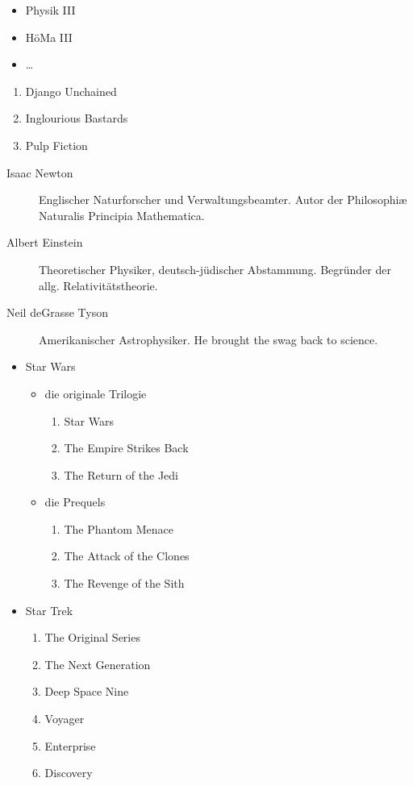 \documentclass{scrartcl}
\begin{document}
\begin{itemize}
  \item Physik III
  \item HöMa III
  \item …
\end{itemize}

\begin{enumerate}
  \item Django Unchained
  \item Inglourious Bastards
  \item Pulp Fiction
\end{enumerate}

\begin{description}
  \item[Isaac Newton] Englischer Naturforscher und Verwaltungsbeamter.
    Autor der Philosophiæ Naturalis Principia Mathematica.
  \item[Albert Einstein] Theoretischer Physiker, deutsch-jüdischer Abstammung.
    Begründer der allg. Relativitätstheorie.
  \item[Neil deGrasse Tyson] Amerikanischer Astrophysiker.
    He brought the swag back to science.
\end{description}

\begin{itemize}
  \item Star Wars
    \begin{itemize}
      \item die originale Trilogie
        \begin{enumerate}
          \item Star Wars
          \item The Empire Strikes Back
          \item The Return of the Jedi
        \end{enumerate}
      \item die Prequels
        \begin{enumerate}
          \item The Phantom Menace
          \item The Attack of the Clones
          \item The Revenge of the Sith
        \end{enumerate}
    \end{itemize}
  \item Star Trek
    \begin{enumerate}
      \item The Original Series
      \item The Next Generation
      \item Deep Space Nine
      \item Voyager
      \item Enterprise
      \item Discovery
    \end{enumerate}
\end{itemize}
\end{document}

